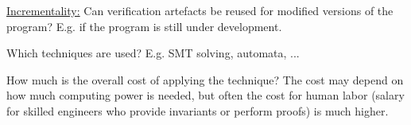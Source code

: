\documentclass[a4paper]{article}
\begin{document}
\begin{minipage}[t]{0.16\linewidth}
\begin{betterlist}
\begin{betterlist}
			\item \underline{Incrementality:} Can verification artefacts be reused for modified versions of the program? E.g. if the program is still under development.

			\item Which techniques are used? E.g. SMT solving, automata, ...

			\item How much is the overall cost of applying the technique? The cost may depend on how much computing power is needed, but often the cost for human labor (salary for skilled engineers who provide invariants or perform proofs) is much higher.

		\end{betterlist}
	\end{betterlist}
\end{minipage}

\newpage
\end{document}
